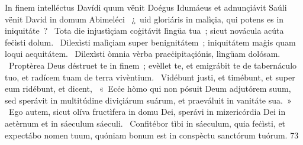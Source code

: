 { In finem intelléctus Davídi  quum vënit Doégus Idumáeus et adnunçiávit Saúli vënit David in domum Abimeléci}
{%
~¿~uid gloriáris in malìçia, qui potens es in iniquitáte~? 
~Tota die injustìçiam coġitávit lìngüa tua~; sicut novácula acúta feċìsti dolum. 
~Dilexìsti malìçiam super benignitátem~; iniquitátem maġis quam loqui aequitátem. 
~Dilexìsti òmnia vèrba praeċipitaçiónis, lìngüam dolósam. 
~Proptèrea Deus déstruet te in finem~; evèllet te, et emigrábit te de tabernáculo tuo, et radícem tuam de terra vivèntium. 
~Vidébunt justi, et timébunt, et super eum ridébunt, et dicent, 
~«~Ecċe hòmo qui non pósuit Deum adjutórem suum, sed sperávit in multitúdine diviçiárum suárum, et praeváluit in vanitáte sua.~»
~Ego autem, sicut olíva fructìfera in domu Dei, sperávi in mizericórdia Dei in aetèrnum et in sáeculum sáeculi. 
~Confitébor tìbi in sáeculum, quia feċìsti, et expectábo nomen tuum, quóniam bonum est in conspèctu sanctórum tuórum. 
}
{7}{3}
